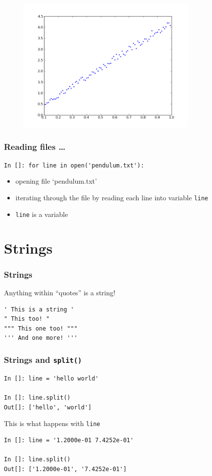 \documentclass[14pt,compress]{beamer}
\newcommand{\typ}[1]{\lstinline{#1}}
\newcommand{\kwrd}[1]{ \texttt{\textbf{\color{blue}{#1}}}  }
\begin{document}
\begin{frame}[fragile]
\begin{figure}
\includegraphics[width=3.5in]{data/L-Tsq.png}
\end{figure}
\end{frame}

\begin{frame}[fragile]
  \frametitle{Reading files \ldots}
\typ{In []: for line in open('pendulum.txt'):}
\begin{itemize}
\item opening file `pendulum.txt'
\item iterating through the file by reading each line into variable \typ{line}
\item \typ{line} is a \kwrd{string} variable
\end{itemize}
\end{frame}

\section{Strings}
\begin{frame}[fragile]
\frametitle{Strings}
Anything within ``quotes'' is a string!
\begin{lstlisting}
' This is a string '  
" This too! "
""" This one too! """
''' And one more! '''
\end{lstlisting}
\end{frame}

\begin{frame}[fragile]
\frametitle{Strings and \typ{split()}}
  \begin{lstlisting}
In []: line = 'hello world'

In []: line.split()
Out[]: ['hello', 'world']
  \end{lstlisting}
This is what happens with \typ{line}
  \begin{lstlisting}
In []: line = '1.2000e-01 7.4252e-01'

In []: line.split()
Out[]: ['1.2000e-01', '7.4252e-01']
  \end{lstlisting}
\end{frame}
\end{document}
